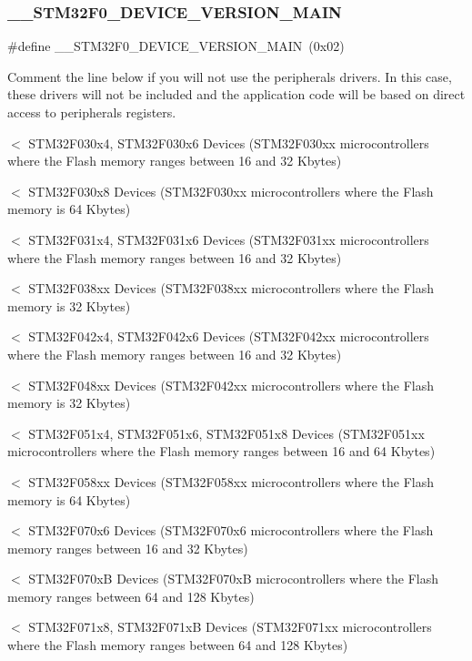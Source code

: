 \subsubsection{\texorpdfstring{\+\_\+\+\_\+\+S\+T\+M32\+F0\+\_\+\+D\+E\+V\+I\+C\+E\+\_\+\+V\+E\+R\+S\+I\+O\+N\+\_\+\+M\+A\+IN}{\_\_STM32F0\_DEVICE\_VERSION\_MAIN}}
{\footnotesize\ttfamily \#define \+\_\+\+\_\+\+S\+T\+M32\+F0\+\_\+\+D\+E\+V\+I\+C\+E\+\_\+\+V\+E\+R\+S\+I\+O\+N\+\_\+\+M\+A\+IN~(0x02)}



Comment the line below if you will not use the peripherals drivers. In this case, these drivers will not be included and the application code will be based on direct access to peripherals registers. 

$<$ S\+T\+M32\+F030x4, S\+T\+M32\+F030x6 Devices (S\+T\+M32\+F030xx microcontrollers where the Flash memory ranges between 16 and 32 Kbytes)

$<$ S\+T\+M32\+F030x8 Devices (S\+T\+M32\+F030xx microcontrollers where the Flash memory is 64 Kbytes)

$<$ S\+T\+M32\+F031x4, S\+T\+M32\+F031x6 Devices (S\+T\+M32\+F031xx microcontrollers where the Flash memory ranges between 16 and 32 Kbytes)

$<$ S\+T\+M32\+F038xx Devices (S\+T\+M32\+F038xx microcontrollers where the Flash memory is 32 Kbytes)

$<$ S\+T\+M32\+F042x4, S\+T\+M32\+F042x6 Devices (S\+T\+M32\+F042xx microcontrollers where the Flash memory ranges between 16 and 32 Kbytes)

$<$ S\+T\+M32\+F048xx Devices (S\+T\+M32\+F042xx microcontrollers where the Flash memory is 32 Kbytes)

$<$ S\+T\+M32\+F051x4, S\+T\+M32\+F051x6, S\+T\+M32\+F051x8 Devices (S\+T\+M32\+F051xx microcontrollers where the Flash memory ranges between 16 and 64 Kbytes)

$<$ S\+T\+M32\+F058xx Devices (S\+T\+M32\+F058xx microcontrollers where the Flash memory is 64 Kbytes)

$<$ S\+T\+M32\+F070x6 Devices (S\+T\+M32\+F070x6 microcontrollers where the Flash memory ranges between 16 and 32 Kbytes)

$<$ S\+T\+M32\+F070xB Devices (S\+T\+M32\+F070xB microcontrollers where the Flash memory ranges between 64 and 128 Kbytes)

$<$ S\+T\+M32\+F071x8, S\+T\+M32\+F071xB Devices (S\+T\+M32\+F071xx microcontrollers where the Flash memory ranges between 64 and 128 Kbytes)

